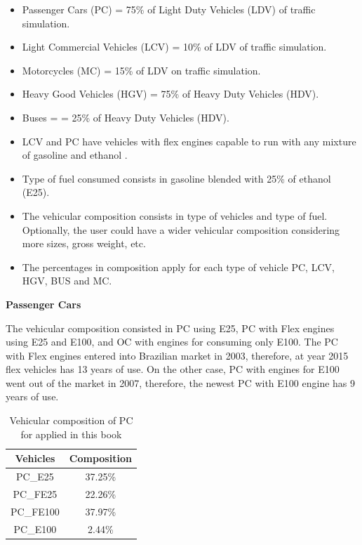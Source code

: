 \documentclass[12pt,graybox,envcountchap,sectrefs]{krantz}
\providecommand{\tightlist}{%
  \setlength{\itemsep}{0pt}\setlength{\parskip}{0pt}}
\theoremstyle{definition}
\theoremstyle{definition}
\theoremstyle{definition}
\theoremstyle{remark}
\begin{document}
\begin{itemize}
\tightlist
\item
  Passenger Cars (PC) = 75\% of Light Duty Vehicles (LDV) of traffic
  simulation.
\item
  Light Commercial Vehicles (LCV) = 10\% of LDV of traffic simulation.
\item
  Motorcycles (MC) = 15\% of LDV on traffic simulation.
\item
  Heavy Good Vehicles (HGV) = 75\% of Heavy Duty Vehicles (HDV).
\item
  Buses = = 25\% of Heavy Duty Vehicles (HDV).
\item
  LCV and PC have vehicles with flex engines capable to run with any
  mixture of gasoline and ethanol \citep{2005-01-4130}.
\item
  Type of fuel consumed consists in gasoline blended with 25\% of
  ethanol (E25).
\item
  The vehicular composition consists in type of vehicles and type of
  fuel. Optionally, the user could have a wider vehicular composition
  considering more sizes, gross weight, etc.
\item
  The percentages in composition apply for each type of vehicle PC, LCV,
  HGV, BUS and MC.
\end{itemize}

\textbf{Passenger Cars}

The vehicular composition consisted in PC using E25, PC with Flex
engines using E25 and E100, and OC with engines for consuming only E100.
The PC with Flex engines entered into Brazilian market in 2003,
therefore, at year 2015 flex vehicles has 13 years of use. On the other
case, PC with engines for E100 went out of the market in 2007,
therefore, the newest PC with E100 engine has 9 years of use.

\begin{table}

\caption{\label{tab:comppc}Vehicular composition of PC for applied in this book}
\centering
\begin{tabular}[t]{cc}
\toprule
Vehicles & Composition\\
\midrule
PC\_E25 & 37.25\%\\
PC\_FE25 & 22.26\%\\
PC\_FE100 & 37.97\%\\
PC\_E100 & 2.44\%\\
\bottomrule
\end{tabular}
\end{table}
\end{document}
